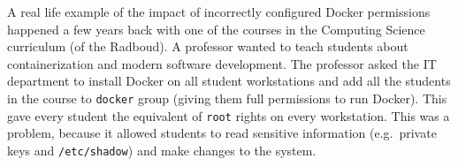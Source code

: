 \medskip

A real life example of the impact of incorrectly configured Docker permissions happened a few years back with one of the courses in the Computing Science curriculum (of the Radboud). A professor wanted to teach students about containerization and modern software development. The professor asked the IT department to install Docker on all student workstations and add all the students in the course to \lstinline{docker} group (giving them full permissions to run Docker). This gave every student the equivalent of \lstinline{root} rights on every workstation. This was a problem, because it allowed students to read sensitive information (e.g.\ private keys and \lstinline{/etc/shadow}) and make changes to the system.
